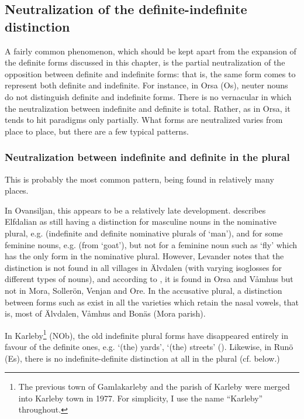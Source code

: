 \subsection{ Neutralization of the definite-indefinite distinction}
\label{bkm:Ref114304507}

A fairly common phenomenon, which should be kept apart from the expansion of the definite forms discussed in this chapter, is the partial neutralization of the opposition between definite and indefinite forms: that is, the same form comes to represent both definite and indefinite. For instance, in Orsa (Os), neuter nouns do not distinguish definite and indefinite forms. There is no vernacular in which the neutralization between indefinite and definite is total. Rather, as in Orsa, it tends to hit paradigms only partially. What forms are neutralized varies from place to place, but there are a few typical patterns.

\subsubsection{Neutralization between indefinite and definite in the plural}
 This is probably the most common pattern, being found in relatively many places. 

In Ovansiljan, this appears to be a relatively late development. \citet{Levander1909} describes Elfdalian as still having a distinction for masculine nouns in the nominative plural, e.g. (indefinite and definite nominative plurals of ‘man’), and for some feminine nouns, e.g.  (from  ‘goat’), but not for a feminine noun such as ‘fly’ which has the only form  in the nominative plural. However, Levander notes that the distinction is not found in all villages in Älvdalen (with varying isoglosses for different types of nouns), and according to \citet[170]{Levander1928}, it is found in Orsa and Våmhus but not in Mora, Sollerön, Venjan and Ore. In the accusative plural, a distinction between forms such as exist in all the varieties which retain the nasal vowels, that is, most of Älvdalen, Våmhus and Bonäs (Mora parish). 

In Karleby\footnote{ The previous town of Gamlakarleby and the parish of Karleby were merged into Karleby town in 1977. For simplicity, I use the name “Karleby” throughout. } (NOb), the old indefinite plural forms have disappeared entirely in favour of the definite ones, e.g.  ‘(the) yards’,  ‘(the) streets’ (\citet[93]{Hagfors1891}). Likewise, in Runö (Es), there is no indefinite-definite distinction at all in the plural (cf.  below.)

